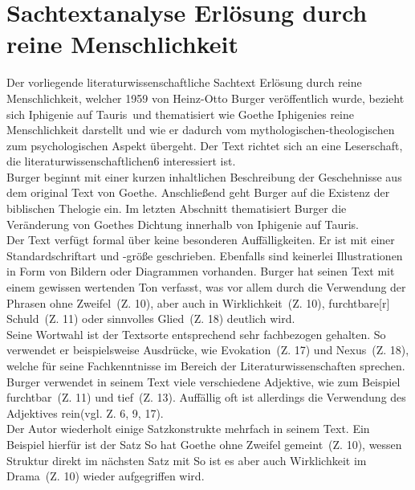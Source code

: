 \documentclass[12pt,a4paper]{report}
\begin{document}
	\section{Sachtextanalyse \dq Erlösung durch reine Menschlichkeit\dq}
	Der vorliegende literaturwissenschaftliche Sachtext \dq Erlösung durch reine Menschlichkeit\dq, welcher 1959 von Heinz-Otto Burger veröffentlich wurde, bezieht sich \dq Iphigenie auf Tauris\dq\ und thematisiert wie Goethe Iphigenies reine Menschlichkeit darstellt und wie er dadurch vom mythologischen-theologischen zum psychologischen Aspekt übergeht.
	Der Text richtet sich an eine Leserschaft, die literaturwissenschaftlichen6 interessiert ist. \\
	Burger beginnt mit einer kurzen inhaltlichen Beschreibung der Geschehnisse aus dem original Text von Goethe.
	Anschließend geht Burger auf die Existenz der biblischen Thelogie ein.
	Im letzten Abschnitt thematisiert Burger die Veränderung von Goethes Dichtung innerhalb von \dq Iphigenie auf Tauris\dq.
	\\
	Der Text verfügt formal über keine besonderen Auffälligkeiten.
	Er ist mit einer Standardschriftart und -größe geschrieben.
	Ebenfalls sind keinerlei Illustrationen in Form von Bildern oder Diagrammen vorhanden.
	Burger hat seinen Text mit einem gewissen wertenden Ton verfasst, was vor allem durch die Verwendung der Phrasen \dq ohne Zweifel\dq\ (Z. 10), \dq aber auch in Wirklichkeit\dq\ (Z. 10), \dq furchtbare[r] Schuld\dq\ (Z. 11) oder \dq sinnvolles Glied\dq\ (Z. 18) deutlich wird. \\
	Seine Wortwahl ist der Textsorte entsprechend sehr fachbezogen gehalten.
	So verwendet er beispielsweise Ausdrücke, wie \dq Evokation\dq\ (Z. 17) und \dq Nexus\dq\ (Z. 18), welche für seine Fachkenntnisse im Bereich der Literaturwissenschaften sprechen.
	Burger verwendet in seinem Text viele verschiedene Adjektive, wie zum Beispiel \dq furchtbar\dq\ (Z. 11) und \dq tief\dq\ (Z. 13).
	Auffällig oft ist allerdings die Verwendung des Adjektives \dq rein\dq (vgl. Z. 6, 9, 17).
	\\
	Der Autor wiederholt einige Satzkonstrukte mehrfach in seinem Text.
	Ein Beispiel hierfür ist der Satz \dq So hat Goethe ohne Zweifel gemeint\dq\ (Z. 10), wessen Struktur direkt im nächsten Satz mit \dq So ist es aber auch Wirklichkeit im Drama\dq\ (Z. 10) wieder aufgegriffen wird.
\end{document}
